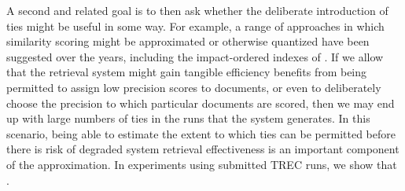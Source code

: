 A second and related goal is to then ask whether the deliberate
introduction of ties might be useful in some way.
For example, a range of approaches in which similarity scoring might
be approximated or otherwise quantized have been suggested over the
years, including the impact-ordered indexes of {\citet{am06sigir}}.
If we allow that the retrieval system might gain tangible efficiency
benefits from being permitted to assign low precision scores to
documents, or even to deliberately choose the precision to which
particular documents are scored, then we may end up with large
numbers of ties in the runs that the system generates.
In this scenario, being able to estimate the extent to which ties can
be permitted before there is risk of degraded system retrieval
effectiveness is an important component of the approximation.
In experiments using submitted TREC runs, we show that
{}.

{}
